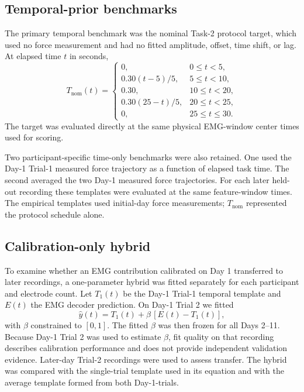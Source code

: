 \documentclass[preprint,12pt]{elsarticle}
\begin{document}
\subsection{Temporal-prior benchmarks}

The primary temporal benchmark was the nominal Task-2 protocol target, which used no force measurement and had no fitted amplitude, offset, time shift, or lag. At elapsed time $t$ in seconds,
\begin{equation}
T_{\mathrm{nom}}(t)=
\begin{cases}
0, & 0\le t<5,\\
0.30(t-5)/5, & 5\le t<10,\\
0.30, & 10\le t<20,\\
0.30(25-t)/5, & 20\le t<25,\\
0, & 25\le t\le 30.
\end{cases}
\end{equation}
The target was evaluated directly at the same physical EMG-window center times used for scoring.

Two participant-specific time-only benchmarks were also retained. One used the Day-1 Trial-1 measured force trajectory as a function of elapsed task time. The second averaged the two Day-1 measured force trajectories. For each later held-out recording these templates were evaluated at the same feature-window times. The empirical templates used initial-day force measurements; $T_{\mathrm{nom}}$ represented the protocol schedule alone.

\subsection{Calibration-only hybrid}

To examine whether an EMG contribution calibrated on Day 1 transferred to later recordings, a one-parameter hybrid was fitted separately for each participant and electrode count. Let $T_1(t)$ be the Day-1 Trial-1 temporal template and $E(t)$ the EMG decoder prediction. On Day-1 Trial 2 we fitted
\begin{equation}
\hat y(t)=T_1(t)+\beta\,[E(t)-T_1(t)],
\end{equation}
with $\beta$ constrained to $[0,1]$. The fitted $\beta$ was then frozen for all Days 2--11. Because Day-1 Trial 2 was used to estimate $\beta$, fit quality on that recording describes calibration performance and does not provide independent validation evidence. Later-day Trial-2 recordings were used to assess transfer. The hybrid was compared with the single-trial template used in its equation and with the average template formed from both Day-1-trials.
\end{document}
